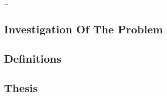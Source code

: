 \ldots

\subsection{Investigation Of The Problem}
\label{sec:intro_problem}


\subsection{Definitions}
\label{sec:intro_def}


\subsection{Thesis}
\label{sec:intro_thesis}
